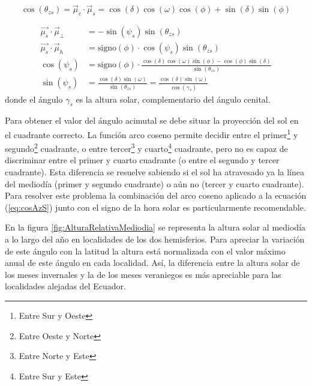 \begin{equation}
\cos\left(\theta_{zs}\right)=\vec{\mu}_{c}\cdot\vec{\mu}_{s}=\cos\left(\delta\right)\cos\left(\omega\right)\cos\left(\phi\right)+\sin\left(\delta\right)\sin\left(\phi\right)\label{eq:cosThetaZs}\end{equation}


\begin{align}
\vec{\mu_{s}}\cdot\vec{\mu}_{\bot} & =-\sin\left(\psi_{s}\right)\sin\left(\theta_{zs}\right)\\
\vec{\mu_{s}}\cdot\vec{\mu}_{h} & =\mathrm{signo}(\phi)\cdot\cos\left(\psi_{s}\right)\sin\left(\theta_{zs}\right)\\
\cos\left(\psi_{s}\right) & =\mathrm{signo}(\phi)\cdot\frac{\cos\left(\delta\right)\cos\left(\omega\right)\sin\left(\phi\right)-\cos\left(\phi\right)\sin\left(\delta\right)}{\sin\left(\theta_{zs}\right)}\label{eq:cosAzS}\\
\sin(\psi_{s}) &
=\frac{\cos(\delta)\sin(\omega)}{\sin(\theta_{zs})}=\frac{\cos(\delta)\sin(\omega)}{\cos(\gamma_{s})}\label{eq:sinAzS}
\end{align}
donde el ángulo $\gamma_{s}$ es la altura solar, complementario del
ángulo cenital.

Para obtener el valor del ángulo acimutal se debe situar la proyección
del sol en el cuadrante correcto. La función arco coseno permite decidir entre
el primer\footnote{Entre Sur y Oeste} y segundo\footnote{Entre Oeste y
  Norte} cuadrante, o entre tercer\footnote{Entre Norte y Este} y
cuarto\footnote{Entre Sur y Este} cuadrante, pero no es capaz de
discriminar entre el primer y cuarto cuadrante (o entre el segundo y
tercer cuadrante). Esta diferencia se resuelve sabiendo si el sol ha
atravesado ya la línea del mediodía (primer y segundo cuadrante) o aún
no (tercer y cuarto cuadrante). Para resolver este problema la
combinación del arco coseno aplicado a la ecuación (\ref{eq:cosAzS})
junto con el signo de la hora solar es particularmente recomendable.

En la figura \ref{fig:AlturaRelativaMediodia} se representa la altura
solar al mediodía a lo largo del año en localidades de los dos hemisferios.
Para apreciar la variación de este ángulo con la latitud la altura
está normalizada con el valor máximo anual de este ángulo en cada
localidad. Así, la diferencia entre la altura solar de los meses invernales
y la de los meses veraniegos es más apreciable para las localidades
alejadas del Ecuador.



